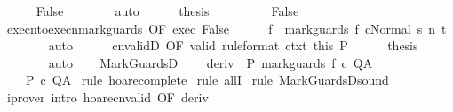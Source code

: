\begin{isabellebody}
\ \ \ \ \isamarkupfalse%
\ False\isanewline
\ \ \ \ \ \ \isamarkupfalse%
\ auto\isanewline
\ \ \ \ \isamarkupfalse%
\ {\isacharquery}thesis\ \isacommand{{\isachardot}{\isachardot}}\isamarkupfalse%
\isanewline
\ \ \isamarkupfalse%
\isanewline
\ \ \ \ \isamarkupfalse%
\ False\isanewline
\ \ \ \ \isamarkupfalse%
\ execn{\isacharunderscore}to{\isacharunderscore}execn{\isacharunderscore}mark{\isacharunderscore}guards\ {\isacharbrackleft}OF\ exec\ False{\isacharbrackright}\isanewline
\ \ \ \ \isamarkupfalse%
\ f{\isacharprime}\ \ {\isachardoublequoteopen}{\isasymGamma}{\isasymturnstile}{\isasymlangle}mark{\isacharunderscore}guards\ f\ c{\isacharcomma}Normal\ s{\isasymrangle}\ {\isacharequal}n{\isasymRightarrow}\ t{\isachardoublequoteclose}\isanewline
\ \ \ \ \ \ \isamarkupfalse%
\ auto\isanewline
\ \ \ \ \isamarkupfalse%
\ cnvalidD\ {\isacharbrackleft}OF\ valid\ {\isacharbrackleft}rule{\isacharunderscore}format{\isacharbrackright}\ ctxt\ this\ P{\isacharbrackright}\isanewline
\ \ \ \ \isamarkupfalse%
\ {\isacharquery}thesis\isanewline
\ \ \ \ \ \ \isamarkupfalse%
\ auto\isanewline
\ \ \isamarkupfalse%
\isanewline
{}\isamarkupfalse%
%
\endisatagproof
{\isafoldproof}%
%
\isadelimproof
\isanewline
%
\endisadelimproof
\isanewline
{}\isamarkupfalse%
\ MarkGuardsD{\isacharcolon}\ \isanewline
\ \ \ deriv{\isacharcolon}\ {\isachardoublequoteopen}{\isasymGamma}{\isacharcomma}{\isasymTheta}{\isasymturnstile}\isactrlbsub {\isacharslash}{\isacharbraceleft}{\isacharbraceright}\isactrlesub \ P\ mark{\isacharunderscore}guards\ f\ c\ Q{\isacharcomma}A{\isachardoublequoteclose}\ \isanewline
\ \ \ {\isachardoublequoteopen}{\isasymGamma}{\isacharcomma}{\isasymTheta}{\isasymturnstile}\isactrlbsub {\isacharslash}{\isacharbraceleft}{\isacharbraceright}\isactrlesub \ P\ c\ Q{\isacharcomma}A{\isachardoublequoteclose}\isanewline
%
\isadelimproof
%
\endisadelimproof
%
\isatagproof
{}\isamarkupfalse%
\ {\isacharparenleft}rule\ hoare{\isacharunderscore}complete{\isacharprime}{\isacharparenright}\isanewline
{}\isamarkupfalse%
\ {\isacharparenleft}rule\ allI{\isacharparenright}\isanewline
{}\isamarkupfalse%
\ {\isacharparenleft}rule\ MarkGuardsD{\isacharunderscore}sound{\isacharparenright}\isanewline
{}\isamarkupfalse%
\ {\isacharparenleft}iprover\ intro{\isacharcolon}\ hoare{\isacharunderscore}cnvalid\ {\isacharbrackleft}OF\ deriv{\isacharbrackright}{\isacharparenright}\isanewline

\end{isabellebody}
